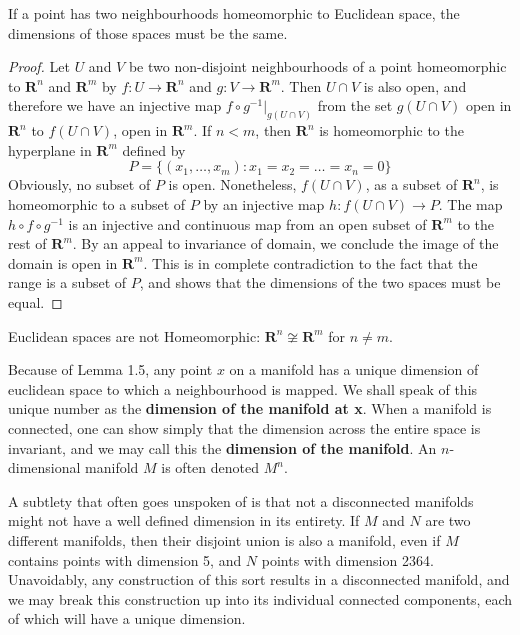 \begin{lemma}
    If a point has two neighbourhoods homeomorphic to Euclidean space, the dimensions of those spaces must be the same.
\end{lemma}
\begin{proof}
    Let $U$ and $V$ be two non-disjoint neighbourhoods of a point homeomorphic to $\mathbf{R}^n$ and $\mathbf{R}^m$ by $f:U \to \mathbf{R}^n$ and $g:V \to \mathbf{R}^m$. Then $U \cap V$ is also open, and therefore we have an injective map $f \circ g^{-1}|_{g(U \cap V)}$ from the set $g(U \cap V)$ open in $\mathbf{R}^n$ to $f(U \cap V)$, open in $\mathbf{R}^m$. If $n < m$, then $\mathbf{R}^n$ is homeomorphic to the hyperplane in $\mathbf{R}^m$ defined by
    \[ P = \{ (x_1, \dots, x_m): x_1 = x_2 = \dots = x_n = 0 \} \]
    Obviously, no subset of $P$ is open. Nonetheless, $f(U \cap V)$, as a subset of $\mathbf{R}^n$, is homeomorphic to a subset of $P$ by an injective map $h: f(U \cap V) \to P$. The map $h \circ f \circ g^{-1}$ is an injective and continuous map from an open subset of $\mathbf{R}^m$ to the rest of $\mathbf{R}^m$. By an appeal to invariance of domain, we conclude the image of the domain is open in $\mathbf{R}^m$. This is in complete contradiction to the fact that the range is a subset of $P$, and shows that the dimensions of the two spaces must be equal.
\end{proof}

\begin{corollary}
    Euclidean spaces are not Homeomorphic: $\mathbf{R}^n \not \cong \mathbf{R}^m$ for $n \neq m$.
\end{corollary}

Because of Lemma 1.5, any point $x$ on a manifold has a unique dimension of euclidean space to which a neighbourhood is mapped. We shall speak of this unique number as the {\bf dimension of the manifold at x}. When a manifold is connected, one can show simply that the dimension across the entire space is invariant, and we may call this the {\bf dimension of the manifold}. An $n$-dimensional manifold $M$ is often denoted $M^n$.

A subtlety that often goes unspoken of is that not a disconnected manifolds might not have a well defined dimension in its entirety. If $M$ and $N$ are two different manifolds, then their disjoint union is also a manifold, even if $M$ contains points with dimension 5, and $N$ points with dimension 2364. Unavoidably, any construction of this sort results in a disconnected manifold, and we may break this construction up into its individual connected components, each of which will have a unique dimension.

